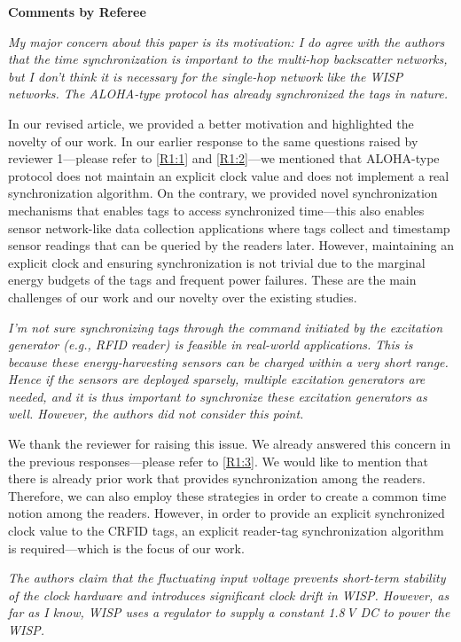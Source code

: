 \documentclass[10pt]{article}
\newcommand{\referee}[1]{
	{\item \color{OliveGreen} \emph{{#1}}}
	\label{R\therefereeCounter:\arabic{enumi}}
}
\newcommand{\response}[1]{{\color{blue} #1}}
\newcounter{refereeCounter}
\newenvironment{responses}{%
\refstepcounter{refereeCounter}%
\textbf{\large Comments by Referee \therefereeCounter}
\begin{enumerate}%
\renewcommand{\labelenumi}{\textbf{[R\therefereeCounter :\,\arabic{enumi}]}} %
}{\end{enumerate}}
\begin{document}
\begin{responses}
	
\referee{My major concern about this paper is its motivation: I do agree with the authors that the time synchronization is important to the multi-hop backscatter networks, but I don’t think it is necessary for the single-hop network like the WISP networks. The ALOHA-type protocol has already synchronized the tags in nature.}
	
\response{In our revised article, we provided a better motivation and highlighted the novelty of our work. In our earlier response to the same questions raised by reviewer 1---please refer to \hyperref[R1:1]{[R1:1]} and \hyperref[R1:2]{[R1:2]}---we mentioned that ALOHA-type protocol does not maintain an explicit clock value and does not implement a real synchronization algorithm. On the contrary, we provided novel synchronization mechanisms that enables tags to access synchronized time---this also enables sensor network-like data collection applications where tags collect and timestamp sensor readings that can be queried by the readers later. However, maintaining an explicit clock and ensuring synchronization is not trivial due to the marginal energy budgets of the tags and frequent power failures. These are the main challenges of our work and our novelty over the existing studies.}
	
\referee{I’m not sure synchronizing tags through the command initiated by the excitation generator (e.g., RFID reader) is feasible in real-world applications. This is because these energy-harvesting sensors can be charged within a very short range. Hence if the sensors are deployed sparsely, multiple excitation generators are needed, and it is thus important to synchronize these excitation generators as well. However, the authors did not consider this point.}
	
\response{We thank the reviewer for raising this issue. We already answered this concern in the previous responses---please refer to \hyperref[R1:3]{[R1:3]}. We would like to mention that there is already prior work that provides synchronization among the readers. Therefore, we can also employ these strategies in order to create a common time notion among the readers. However, in order to provide an explicit synchronized clock value to the CRFID tags, an explicit reader-tag synchronization algorithm is required---which is the focus of our work.}
	
\referee{The authors claim that the fluctuating input voltage prevents short-term stability of the clock hardware and introduces significant clock drift in WISP. However, as far as I know, WISP uses a regulator to supply a constant 1.8\,V DC to power the WISP.}
	

\end{responses}
\end{document}
